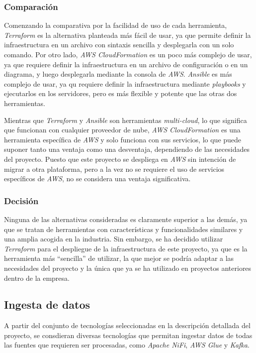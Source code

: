 \subsubsection{Comparación}
Comenzando la comparativa por la facilidad de uso de cada herramienta, \textit{Terraform}
es la alternativa planteada más fácil de usar, ya que permite definir la infraestructura
en un archivo con sintaxis sencilla y desplegarla con un solo comando. Por otro lado,
\textit{AWS CloudFormation} es un poco más complejo de usar, ya que requiere definir
la infraestructura en un archivo de configuración o en un diagrama, y luego desplegarla
mediante la consola de \textit{AWS}. \textit{Ansible} es más complejo de usar, ya qu
requiere definir la infraestructura mediante \textit{playbooks} y ejecutarlos en los
servidores, pero es más flexible y potente que las otras dos herramientas.

Mientras que \textit{Terraform} y \textit{Ansible} son herramientas \textit{multi-cloud},
lo que significa que funcionan con cualquier proveedor de nube, \textit{AWS CloudFormation}
es una herramienta específica de \textit{AWS} y solo funciona con sus servicios, lo que
puede suponer tanto una ventaja como una desventaja, dependiendo de las necesidades del
proyecto. Puesto que este proyecto se despliega en \textit{AWS} sin intención de migrar a
otra plataforma, pero a la vez no se requiere el uso de servicios específicos de \textit{AWS},
no se considera una ventaja significativa.

\subsubsection{Decisión}
Ninguna de las alternativas consideradas es claramente superior a las demás, ya que
se tratan de herramientas con características y funcionalidades similares y una
amplia acogida en la industria. Sin embargo, se ha decidido utilizar \textit{Terraform}
para el despliegue de la infraestructura de este proyecto, ya que es la herramienta
más ``sencilla'' de utilizar, la que mejor se podría adaptar a las necesidades del
proyecto y la única que ya se ha utilizado en proyectos anteriores dentro de la empresa.

\subsection{Ingesta de datos}\label{subsec:ingesta}
A partir del conjunto de tecnologías seleccionadas en la descripción detallada del proyecto,
se consdieran diversas tecnologías que permitan ingestar datos de todas las fuentes que
requieren ser procesadas, como \textit{Apache NiFi}, \textit{AWS Glue} y \textit{Kafka}.

